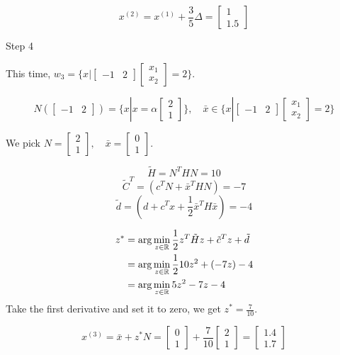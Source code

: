 $$
x^{(2)} = x^{(1)} +\frac{3}{5} \Delta =
\begin{bmatrix}
1\\
1.5
\end{bmatrix}
$$


Step 4

This time, $w_3 = \{x|
\begin{bmatrix}
-1& 2
\end{bmatrix}
\begin{bmatrix}
x_1\\
x_2
\end{bmatrix}
=2
\}$.

$$N(
\begin{bmatrix}
-1& 2
\end{bmatrix})
=
\{x|x=\alpha
\begin{bmatrix}
2\\
1
\end{bmatrix}\},
\quad
\bar{x}\in 
\{x|
\begin{bmatrix}
-1& 2
\end{bmatrix}
\begin{bmatrix}
x_1\\
x_2
\end{bmatrix}
=2
\}
$$

We pick $N=
\begin{bmatrix}
2\\
1
\end{bmatrix}
,\quad
\bar{x}=
\begin{bmatrix}
0\\
1
\end{bmatrix}
$.

$$\tilde{H} = N^THN = 10$$
$$\tilde{C}^T = (c^TN + \bar{x}^T HN)= -7$$
$$\tilde{d}= (d+c^Tx + \frac{1}{2}\bar{x}^TH\bar{x})=-4$$

\begin{align*}
z^* 
&= \arg\min_{z\in\mathbb{R}} \frac{1}{2} z^T\tilde{H}z + \tilde{c}^Tz + \tilde{d}\\
&= \arg\min_{z\in\mathbb{R}} \frac{1}{2}10 z^2 + (-7z) - 4\\
&= \arg\min_{z\in\mathbb{R}} 5z^2 - 7z -4
\end{align*}
Take the first derivative and set it to zero, we get $z^* = \frac{7}{10}$.

\begin{equation*}
x^{(3)}= \bar{x}+ z^*N = 
\begin{bmatrix}
0\\
1
\end{bmatrix}
+ 
\frac{7}{10}
\begin{bmatrix}
2\\
1
\end{bmatrix} = 
\begin{bmatrix}
1.4\\
1.7
\end{bmatrix}
\end{equation*}

